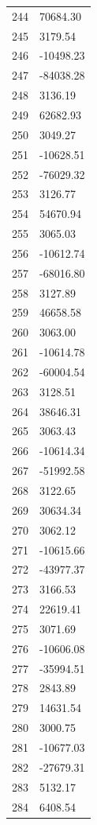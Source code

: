 \documentclass[a4paper,11pt]{article}
\begin{document}
\begin{center}
\begin{longtable}{|R{1.5cm}|R{2.5cm}|}
  244 &     70684.30 \\
  245 &      3179.54 \\
  246 &    -10498.23 \\
  247 &    -84038.28 \\
  248 &      3136.19 \\
  249 &     62682.93 \\
  250 &      3049.27 \\
  251 &    -10628.51 \\
  252 &    -76029.32 \\
  253 &      3126.77 \\
  254 &     54670.94 \\
  255 &      3065.03 \\
  256 &    -10612.74 \\
  257 &    -68016.80 \\
  258 &      3127.89 \\
  259 &     46658.58 \\
  260 &      3063.00 \\
  261 &    -10614.78 \\
  262 &    -60004.54 \\
  263 &      3128.51 \\
  264 &     38646.31 \\
  265 &      3063.43 \\
  266 &    -10614.34 \\
  267 &    -51992.58 \\
  268 &      3122.65 \\
  269 &     30634.34 \\
  270 &      3062.12 \\
  271 &    -10615.66 \\
  272 &    -43977.37 \\
  273 &      3166.53 \\
  274 &     22619.41 \\
  275 &      3071.69 \\
  276 &    -10606.08 \\
  277 &    -35994.51 \\
  278 &      2843.89 \\
  279 &     14631.54 \\
  280 &      3000.75 \\
  281 &    -10677.03 \\
  282 &    -27679.31 \\
  283 &      5132.17 \\
  284 &      6408.54 \\

\end{longtable}
\end{center}
\end{document}
